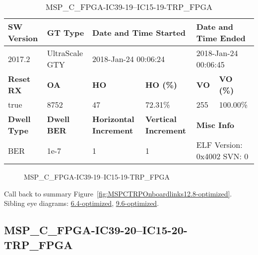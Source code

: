\begin{table}[h]
\centering
\caption{MSP\_C\_FPGA-IC39-19--IC15-19-TRP\_FPGA}
\label{tab:MSPCFPGAIC3919IC1519TRPFPGA12.8-optimized}
\begin{tabular}{@{}|l|l|l|l|l|l|@{}}
\toprule
\textbf{SW Version}                & \textbf{GT Type}   & \multicolumn{2}{l|}{\textbf{Date and Time Started}}            & \multicolumn{2}{l|}{\textbf{Date and Time Ended}}        \\ \midrule
2017.2                       & UltraScale GTY          & \multicolumn{2}{l|}{2018-Jan-24 00:06:24}                   & \multicolumn{2}{l|}{2018-Jan-24 00:06:45}               \\ \midrule
\textbf{Reset RX}                  & \textbf{OA} & \textbf{HO}   & \textbf{HO (\%)} & \textbf{VO} & \textbf{VO (\%)} \\ \midrule
true & 8752        & 47          & 72.31\%        & 255        & 100.00\%       \\ \midrule
\textbf{Dwell Type}                & \textbf{Dwell BER} & \textbf{Horizontal Increment} & \textbf{Vertical Increment}    & \multicolumn{2}{l|}{\textbf{Misc Info}}                  \\ \midrule
BER                            & 1e-7        & 1        & 1           & \multicolumn{2}{l|}{ELF Version: 0x4002 SVN: 0}                         \\ \bottomrule
\end{tabular}
\end{table}

\begin{figure}[h]
\caption{MSP\_C\_FPGA-IC39-19--IC15-19-TRP\_FPGA} \label{fig:MSPCFPGAIC3919IC1519TRPFPGA12.8-optimized}
\end{figure}

Call back to summary Figure~\ref{fig:MSPCTRPOnboardlinks12.8-optimized}.
Sibling eye diagrams: \hyperref[sec:MSPCFPGAIC3919IC1519TRPFPGA6.4-optimized]{6.4-optimized}, \hyperref[sec:MSPCFPGAIC3919IC1519TRPFPGA9.6-optimized]{9.6-optimized}.

\clearpage
\newpage


\subsection{MSP\_C\_FPGA-IC39-20--IC15-20-TRP\_FPGA}\label{sec:MSPCFPGAIC3920IC1520TRPFPGA12.8-optimized}

